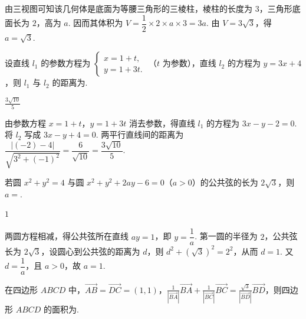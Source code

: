 \begin{solution}
由三视图可知该几何体是底面为等腰三角形的三棱柱，棱柱的长度为 \(3\)，三角形底面长为 \(2\)，高为 \(a\). 因而其体积为 \(V=\dfrac12\times2\times a\times3=3a\). 由 \(V=3\sqrt3\)，得 \(a=\sqrt3\).
\end{solution}

\begin{problem}
设直线 \(l_{1}\) 的参数方程为 \(\begin{cases}
x = 1 + t,\\
y = 1 + 3t.
\end{cases}\) （\(t\) 为参数），直线 \(l_{2}\) 的方程为 \(y = 3x + 4\)，则 \(l_{1}\) 与 \(l_{2}\) 的距离为\fillinblank{}.
\end{problem}

\begin{answer}
\(\frac{3\sqrt{10}}{5}\)
\end{answer}

\begin{solution}
由参数方程 \(x=1+t\)，\(y=1+3t\) 消去参数，得直线 \(l_1\) 的方程为 \(3x-y-2=0\). 将 \(l_2\) 写成 \(3x-y+4=0\). 两平行直线间的距离为 \(\dfrac{|(-2)-4|}{\sqrt{3^2+(-1)^2}}=\dfrac6{\sqrt{10}}=\dfrac{3\sqrt{10}}5\).
\end{solution}

\begin{problem}
若圆 \(x^{2} + y^{2} = 4\) 与圆 \(x^{2} + y^{2} + 2ay - 6 = 0\)（\(a > 0\)）的公共弦的长为 \(2\sqrt{3}\)，则 \(a = \)\fillinblank{}.
\end{problem}

\begin{answer}
\(1\)
\end{answer}

\begin{solution}
两圆方程相减，得公共弦所在直线 \(ay=1\)，即 \(y=\dfrac1a\). 第一圆的半径为 \(2\)，公共弦长为 \(2\sqrt3\)，设圆心到公共弦的距离为 \(d\)，则 \(d^2+\left(\sqrt3\right)^2=2^2\)，从而 \(d=1\). 又 \(d=\dfrac1a\)，且 \(a>0\)，故 \(a=1\).
\end{solution}

\begin{problem}
在四边形 \(ABCD\) 中，\(\overrightarrow{AB} = \overrightarrow{DC} = (1,1)\)，\(\frac{1}{|\overrightarrow{BA}|} \overrightarrow{BA} + \frac{1}{|\overrightarrow{BC}|} \overrightarrow{BC} = \frac{\sqrt{3}}{|\overrightarrow{BD}|} \overrightarrow{BD}\)，则四边形 \(ABCD\) 的面积为\fillinblank{}.
\end{problem}

